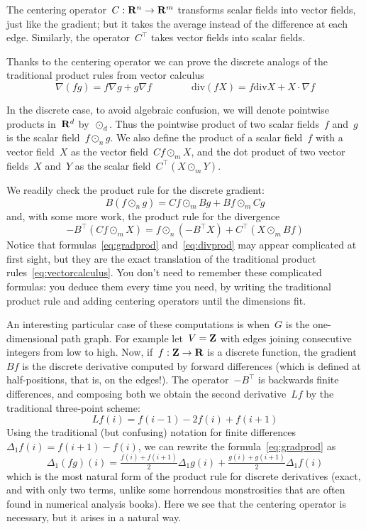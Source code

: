The centering operator~$C:\mathbf{R}^n\to\mathbf{R}^m$ transforms scalar fields into vector
fields, just like the gradient; but it takes the average instead of the
difference at each edge. Similarly, the operator~$C^\top$ takes vector fields
into scalar fields.

Thanks to the centering operator we can prove the discrete analogs of the
traditional product rules from vector calculus
\begin{equation}\label{eq:vectorcalculus}
	\nabla\left(fg\right)=f\nabla g+g\nabla f
	\qquad
	\qquad
	\mathrm{div}\left(fX\right)
	=f\mathrm{div}X+X\cdot\nabla f
\end{equation}

In the discrete case, to avoid algebraic confusion,
we will denote pointwise products in~$\mathbf{R}^d$
by~$\odot_d$.  Thus the pointwise product of two scalar fields~$f$ and~$g$ is
the scalar field~$f\odot_n g$.  We also define the product of a scalar
field~$f$ with a vector field~$X$ as the vector field~$Cf\odot_m X$, and the
dot product of two vector fields~$X$ and~$Y$ as the scalar
field~$C^\top\left(X\odot_m Y\right)$.


We readily check the product rule for the discrete gradient:
\begin{equation}\label{eq:gradprod}
	B\left(f\odot_n g\right)=
	Cf\odot_m Bg + Bf\odot_m Cg
\end{equation}
and, with some more work, the product rule for the divergence
\begin{equation}\label{eq:divprod}
	-B^\top\left(Cf\odot_m X\right)
	=
	f\odot_n\left(-B^\top X\right)
	+C^\top\left(X\odot_m Bf\right)
\end{equation}
Notice that formulas~\eqref{eq:gradprod} and~\eqref{eq:divprod} may appear
complicated at first sight, but they are the exact translation of the
traditional product rules~\eqref{eq:vectorcalculus}.  You don't need to
remember these complicated formulas: you deduce them every time you need, by
writing the traditional product rule and adding centering operators until the
dimensions fit.

{\color{gray}
An interesting particular case of these computations is when~$G$ is the
one-dimensional path graph.  For example let~$V=\mathbf{Z}$ with edges joining
consecutive integers from low to high.  Now, if~$f:\mathbf{Z}\to\mathbf{R}$ is a discrete
function, the gradient~$Bf$ is the discrete derivative computed by forward
differences (which is defined at half-positions, that is, on the edges!).
The operator~$-B^\top$ is backwards finite differences, and composing both we
obtain the second derivative~$L f$ by the traditional three-point scheme:
\[
	Lf (i) = f(i-1) -2f(i)+f(i+1)
\]
Using the traditional (but confusing) notation for finite
differences~$\Delta_1 f(i)=f(i+1)-f(i)$, we can rewrite the
formula~\eqref{eq:gradprod} as
\[
	\Delta_1(fg)(i) =
	\tfrac{f(i)+f(i+1)}2\Delta_1 g(i) +
	\tfrac{g(i)+g(i+1)}2\Delta_1 f(i)
\]
which is the most natural form of the product rule for discrete derivatives
(exact, and with only two terms, unlike some horrendous monstrosities that
are often found in numerical analysis books).  Here we see that the centering
operator is necessary, but it arises in a natural way.
}

